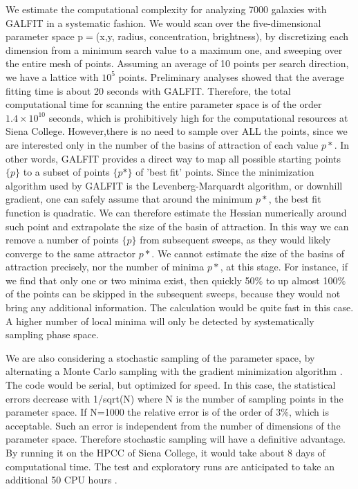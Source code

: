 \documentclass[12pt, preprint]{aastex}
\begin{document}
{We estimate the computational complexity for analyzing 7000
galaxies with GALFIT in a systematic fashion. We would scan over the
five-dimensional parameter space  p$=$(x,y, radius, concentration,
brightness), by discretizing each dimension from a minimum search
value to a maximum one, and sweeping over the entire mesh of points.
Assuming an average of 10 points per search direction, we have a
lattice with $10^5$ points. Preliminary analyses showed that the average
fitting time is about 20 seconds with GALFIT. Therefore, the total
computational time  for scanning the entire parameter space is of the
order $1.4 \times 10^{10}$ seconds, which is  prohibitively high for the
computational resources at Siena College. However,there is no need to
sample over ALL the points, since we are interested only in the number
of the basins of attraction of each value $p*$. In other words, GALFIT
provides a direct way to map all possible starting points $\{p\}$ to a
subset of points $\{p*\}$ of 'best fit' points. Since the minimization
algorithm used by GALFIT is  the Levenberg-Marquardt algorithm, or
downhill gradient, one can safely assume that around the minimum $p*$,
the best fit function is quadratic. We can therefore estimate the
Hessian numerically around such point and extrapolate the size of the
basin of attraction. In this way we can remove a number of points $\{p\}$
from subsequent sweeps, as they would likely converge to the same attractor
$p*$. We cannot estimate the size of the basins of
attraction precisely, nor the number of minima $p*$, at this stage. For
instance, if we find that only one or two minima exist, then quickly
50\% to up almost 100\% of the points can be skipped in the subsequent
sweeps, because they would not bring any  additional information. The
calculation would be quite fast in this case.  A higher number of
local minima will only be detected by systematically sampling phase space.

We are also considering a stochastic sampling of the parameter space,
by alternating a Monte Carlo sampling with the gradient minimization
algorithm \citep{pardo11}. The code would be serial, but optimized for speed. In this
case, the statistical errors decrease with 1/sqrt(N) where N is the
number of sampling points in the parameter space. If N=1000 the
relative error is of the order of 3\%, which is acceptable. Such an error
is independent from the number of dimensions of the parameter space.
Therefore  stochastic sampling will have a definitive advantage.
By running it on the HPCC of Siena College, it would take about 8
days of computational time. The test and exploratory runs are
anticipated to take an additional 50 CPU hours \citep[for a recent
application of this method see,][]{sala12}.

}
\end{document}
